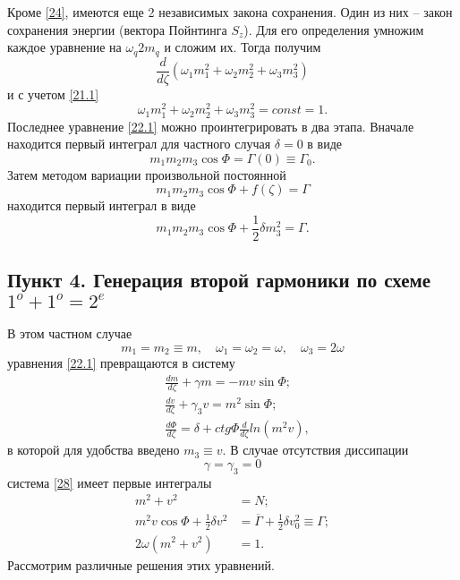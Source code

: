 \documentclass[a4paper]{article}
\begin{document}
 	Кроме \eqref{24}, имеются еще 2 независимых закона сохранения. Один из них – закон сохранения энергии (вектора Пойнтинга $S_{z}$). Для его определения умножим каждое уравнение на $\omega_{q}2m_{q}$ и сложим их. Тогда получим 
 	$$\frac{d}{d\zeta}(\omega_{1}m_{1}^{2}+\omega_{2}m_{2}^{2}+\omega_{3}m_{3}^{2})$$
 	и с учетом \eqref{21.1}
 	\begin{equation}
 		\omega_{1}m_{1}^{2}+\omega_{2}m_{2}^{2}+\omega_{3}m_{3}^{2}=const=1.
 	\end{equation}
 	Последнее уравнение \eqref{22.1} можно проинтегрировать в два этапа. Вначале находится первый интеграл для частного случая $\delta=0$ в виде 
 	\begin{equation}
 		m_{1}m_{2}m_{3}\cos\Phi=\Gamma(0)\equiv\Gamma_{0}.\tag{26'}\label{26'}
 	\end{equation}
 	Затем методом вариации произвольной постоянной $$m_{1}m_{2}m_{3}\cos\Phi+f(\zeta)=\Gamma$$ находится первый интеграл в виде
 	\begin{equation}
 		m_{1}m_{2}m_{3}\cos\Phi+\frac{1}{2}\delta m_{3}^{2}=\Gamma.\label{26}
 	\end{equation}
 	\subsection*{Пункт 4. Генерация второй гармоники по схеме $1^{o}+1^{o}=2^{e}$} 
 	В этом частном случае
 	\begin{equation}
 		m_{1}=m_{2}\equiv m,\quad\omega_{1}=\omega_{2}=\omega,\quad\omega_{3}=2\omega\label{27}
 	\end{equation}
 	уравнения \eqref{22.1} превращаются в систему
 	\begin{equation}
 		\begin{aligned}
 			&\frac{dm}{d\zeta}+\gamma m=-mv\sin\Phi;\\
 			&\frac{dv}{d\zeta}+\gamma_{3}v=m^{2}\sin\Phi;\\
 			&\frac{d\Phi}{d\zeta}=\delta+ctg\Phi\frac{d}{d\zeta}ln(m^{2}v),\label{28}
 		\end{aligned}
 	\end{equation}
 	в которой для удобства введено $m_{3}\equiv v$. В случае отсутствия диссипации 
 	\begin{equation}
 		\gamma=\gamma_{3}=0\tag{23'}\label{23'}
 	\end{equation}
 	система \eqref{28} имеет первые интегралы  
 	\begin{align}
 		m^{2}+v^{2}&=N;\tag{29а}\label{29a}\\
 		m^{2}v\cos\Phi+\frac{1}{2}\delta v^{2}&=\overline{\Gamma}+\frac{1}{2}\delta v_{0}^{2}\equiv\Gamma;\tag{29b}\label{29b}\\
 		2\omega(m^{2}+v^{2})&=1.\tag{29c}\label{29c}
 	\end{align}
 	\setcounter{equation}{29}
 	Рассмотрим различные решения этих уравнений.
 	\setcounter{section}{4}
\end{document}
